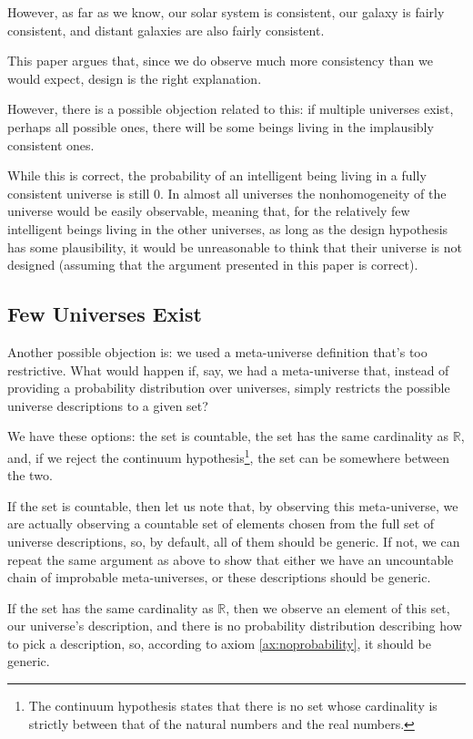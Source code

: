 \documentclass[a4paper
,draft
]{article}
\def\reale{\mathbb{R}}
\newcommand{\paper}[1]{paper}
\begin{document}
However, as far as we know, our solar system is consistent, our galaxy is
fairly consistent, and distant galaxies are also fairly consistent.

This \paper{} argues that, since we do observe much more consistency
than we would expect, design is the right explanation.

However, there is a possible objection related to this: if multiple universes
exist, perhaps all possible ones, there will be some beings living in the
implausibly consistent ones.

While this is correct, the probability of an intelligent being
living in a fully consistent universe is still $0$.
In almost all universes the nonhomogeneity of the universe would be
easily observable, meaning that, for the relatively few intelligent beings
living in the other universes, as long as the design hypothesis
has some plausibility, it would be unreasonable to think that
their universe is not designed (assuming that the argument presented in
this \paper{} is correct).

\subsection{Few Universes Exist}
\label{sec:fewuniverses}

Another possible objection is: we used a meta-universe definition that's too
restrictive. What would happen if, say, we had a meta-universe that, instead
of providing a probability distribution over universes, simply restricts the
possible universe descriptions to a given set?

We have these options: the set is countable, the set has the same cardinality
as $\reale$, and, if we reject the continuum hypothesis\footnote{
  The continuum hypothesis states that there is no set whose cardinality is
  strictly between that of the natural numbers and the real numbers.
}, the set can be somewhere between the two.

If the set is countable, then let us note that, by observing this meta-universe,
we are actually observing a countable set of elements chosen from the full
set of universe descriptions, so, by default, all of them should be generic.
If not, we can repeat the same argument as above to show that either we have
an uncountable chain of improbable meta-universes, or these descriptions should be
generic.

If the set has the same cardinality as $\reale$,
then we observe an element of this set, our universe's description, and there
is no probability distribution describing how to pick a description, so,
according to axiom \ref{ax:noprobability}, it should be generic.
\end{document}
